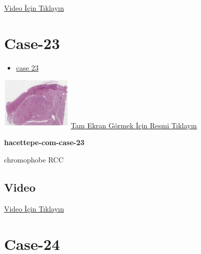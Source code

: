 \documentclass[
  letterpaper,
  DIV=11,
  numbers=noendperiod]{scrreprt}
\providecommand{\tightlist}{%
  \setlength{\itemsep}{0pt}\setlength{\parskip}{0pt}}\usepackage{longtable,booktabs,array}
\begin{document}
\href{https://www.youtube.com/watch?v=wo6N0q5EiWc}{Video İçin Tıklayın}

\hypertarget{sec-hacettepe-case-of-the-month-case-23}{%
\section{Case-23}\label{sec-hacettepe-case-of-the-month-case-23}}

\begin{itemize}
\tightlist
\item
  \href{https://www.youtube.com/watch?v=2j0ER0ShVR0\&ab_channel=KemalKosemehmetoglu}{case
  23}
\end{itemize}

\href{https://images.patolojiatlasi.com/hacettepe-com-case-23/HE.html}{\includegraphics[width=0.25\textwidth,height=\textheight]{./screenshots/hacettepe-com-case-23_screenshot.png}}
\href{https://images.patolojiatlasi.com/hacettepe-com-case-23/HE.html}{Tam
Ekran Görmek İçin Resmi Tıklayın}

\textbf{hacettepe-com-case-23}

\begin{tcolorbox}[enhanced jigsaw, left=2mm, toprule=.15mm, rightrule=.15mm, bottomrule=.15mm, leftrule=.75mm, colback=white, colframe=quarto-callout-tip-color-frame, toptitle=1mm, breakable, titlerule=0mm, colbacktitle=quarto-callout-tip-color!10!white, bottomtitle=1mm, title=\textcolor{quarto-callout-tip-color}{\faLightbulb}\hspace{0.5em}{Tanı}, arc=.35mm, opacitybacktitle=0.6, opacityback=0, coltitle=black]

chromophobe RCC

\end{tcolorbox}

\hypertarget{video-21}{%
\subsection{Video}\label{video-21}}

\href{https://www.youtube.com/watch?v=2j0ER0ShVR0}{Video İçin Tıklayın}

\hypertarget{sec-hacettepe-case-of-the-month-case-24}{%
\section{Case-24}\label{sec-hacettepe-case-of-the-month-case-24}}
\end{document}
